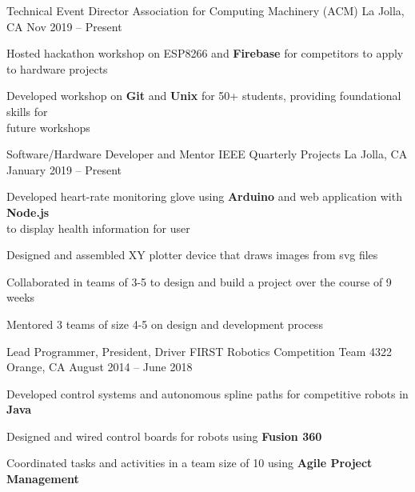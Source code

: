 \documentclass[]{awesome-cv}
\begin{document}
\vspace{-5mm}
\begin{cventries}
	\cventry
  {Technical Event Director}
  {Association for Computing Machinery (ACM)}
	{La Jolla, CA}
  {Nov 2019 – Present}
	{\begin{cvitems}
    \item {Hosted hackathon workshop on ESP8266 and \textbf{Firebase} for
      competitors to apply to hardware projects}
    \item {Developed workshop on \textbf{Git} and \textbf{Unix} for 50+
      students, providing foundational skills for \\ future workshops}
		\end{cvitems}}

	\vspace{-3mm}
	\cventry
  {Software/Hardware Developer and  Mentor}
	{IEEE Quarterly Projects}
	{La Jolla, CA}
  {January 2019 – Present}
	{\begin{cvitems}
    \item {Developed heart-rate monitoring glove using \textbf{Arduino} and
      web application with \textbf{Node.js}\\ to display health information for
      user}
    \item {Designed and assembled XY plotter device that draws images from svg
      files}
    \item {Collaborated in teams of 3-5 to design and build a project over the
      course of 9 weeks}
    \item {Mentored 3 teams of size 4-5 on design and development process}
		\end{cvitems}}

  \vspace{-3mm}
	\cventry
	{Lead Programmer, President, Driver}
	{FIRST Robotics Competition Team 4322}
	{Orange, CA}
	{August 2014 – June 2018}
	{\begin{cvitems}
		\item {Developed control systems and autonomous spline paths for competitive robots in
      \textbf{Java}}
    \item {Designed and wired control boards for robots using
      \textbf{Fusion 360}}
    \item {Coordinated tasks and activities in a team size of 10 using \textbf{Agile
      Project Management}}
		\end{cvitems}}


\end{cventries}
\end{document}
